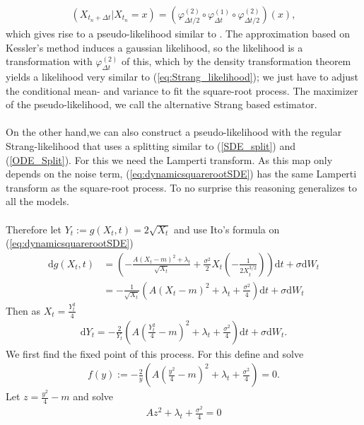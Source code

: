 \begin{align}
    \left(X_{t_n + \Delta t} | X_{t_n} = x\right) = \left(\varphi_{\Delta t/2}^{(2)} \circ \varphi_{\Delta t}^{(1)} \circ \varphi_{\Delta t/2}^{(2)}\right)(x),
\end{align} 
which gives rise to a pseudo-likelihood similar to \cite[(14)]{SplittingSchemes}. The approximation based on Kessler's method induces a gaussian likelihood, so the likelihood is a transformation with $\varphi_{\Delta t}^{(2)}$ of this, which by the density transformation theorem yields a likelihood very similar to (\ref{eq:Strang_likelihood}); we just have to adjust the conditional mean- and variance to fit the square-root process. The maximizer of the pseudo-likelihood, we call the alternative Strang based estimator.\\\\
On the other hand,we can also construct a pseudo-likelihood with the regular Strang-likelihood that uses a splitting similar to (\ref{SDE_split}) and (\ref{ODE_Split}). For this we need the Lamperti transform. As this map only depends on the noise term, (\ref{eq:dynamicsquarerootSDE}) has the same Lamperti transform as the square-root process. To no surprise this reasoning generalizes to all the models.\\\\
Therefore let $Y_t:= g(X_t, t) = 2\sqrt{X_t}$ and use Ito's formula on (\ref{eq:dynamicsquarerootSDE})
\begin{align}
    \mathrm{d}g(X_t, t) &= \left(-\frac{A(X_t - m)^2 + \lambda_t}{\sqrt{X_t}} + \frac{\sigma^2}{2}X_t\left(-\frac{1}{2X_t^{3/2}}\right)\right)\mathrm{d}t + \sigma\mathrm{d}W_t\nonumber \\
    &= -\frac{1}{\sqrt{X_t}}\left(A\left(X_t - m\right)^2 + \lambda_t + \frac{\sigma^2}{4}\right)\mathrm{d}t + \sigma\mathrm{d}W_t
\end{align}
Then as $X_t = \frac{Y_t^2}{4}$
\begin{align}
    \mathrm{d}Y_t = - \frac{2}{Y_t}\left(A\left(\frac{Y_t^2}{4} - m\right)^2 + \lambda_t + \frac{\sigma^2}{4}\right)\mathrm{d}t + \sigma \mathrm{d}W_t. \label{eq:lampertiTransformedDynamicSquareroot}
\end{align}
We first find the fixed point of this process. For this define and solve
\begin{align}
    f(y) := -\frac{2}{y}\left(A\left(\frac{y^2}{4}-m\right)^2 + \lambda_t + \frac{\sigma^2}{4}\right) = 0.
\end{align}
Let $z = \frac{y^2}{4}-m$ and solve
\begin{align}
    Az^2 + \lambda_t + \frac{\sigma^2}{4} = 0
\end{align}
